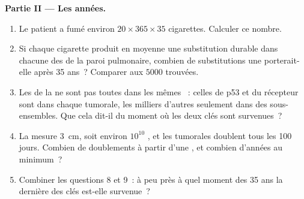 \begin{problem}
\medskip
\noindent\textbf{Partie II --- Les années.}
\begin{enumerate}[resume]
  \item Le patient a fumé environ $20 \times 365 \times 35$
        cigarettes. Calculer ce nombre.
  \item Si chaque cigarette produit en moyenne une substitution
        durable dans chacune des  de la paroi pulmonaire,
        combien de substitutions une  porterait-elle après 35
        ans~? Comparer aux $\num{5000}$ trouvées.
  \item Les  de la  ne sont pas toutes dans les mêmes
        ~: celles de p53 et du récepteur sont dans chaque
         tumorale, les milliers d'autres seulement dans des
        sous-ensembles. Que cela dit-il du moment où les deux 
        clés sont survenues~?
  \item La  mesure \qty{3}{cm}, soit environ $10^{10}$ ,
        et les  tumorales doublent tous les 100 jours. Combien
        de doublements à partir d'une , et combien d'années au
        minimum~?
  \item Combiner les questions 8 et 9~: à peu près à quel moment des 35
        ans la dernière des  clés est-elle survenue~?
\end{enumerate}


\end{problem}
